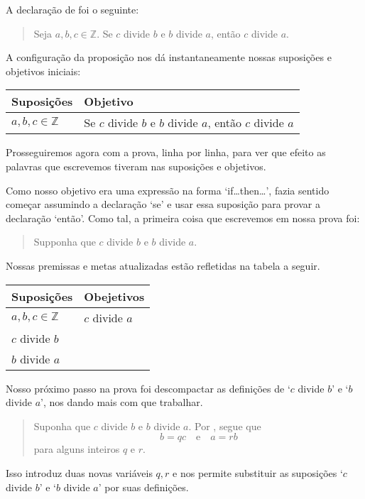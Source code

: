 \begin{example}
\label{exAssumptionsGoals}
A declaração de  foi o seguinte:
\begin{quote}
Seja $a,b,c \in \mathbb{Z}$. Se $c$ divide $b$ e $b$ divide $a$, então $c$ divide $a$.
\end{quote}
A configuração da proposição nos dá instantaneamente nossas suposições e objetivos iniciais:
\begin{center}
\begin{tabular}{C{150pt}|C{150pt}}
\textbf{Suposições} & \textbf{Objetivo} \\ \hline
$a,b,c \in \mathbb{Z}$ & Se $c$ divide $b$ e $b$ divide $a$, então $c$ divide $a$
\end{tabular}
\end{center}
Prosseguiremos agora com a prova, linha por linha, para ver que efeito as palavras que escrevemos tiveram nas suposições e objetivos.

Como nosso objetivo era uma expressão na forma `if\dots{}then\dots{}', fazia sentido começar assumindo a declaração `se' e usar essa suposição para provar a declaração `então'. Como tal, a primeira coisa que escrevemos em nossa prova foi:
\begin{quote}
Supponha que $c$ divide $b$ e $b$ divide $a$.
\end{quote}
Nossas premissas e metas atualizadas estão refletidas na tabela a seguir.
\begin{center}
\begin{tabular}{C{150pt}|C{150pt}}
\textbf{Suposições} & \textbf{Obejetivos} \\ \hline
$a,b,c \in \mathbb{Z}$ & $c$ divide $a$ \\
$c$ divide $b$ & \\
$b$ divide $a$ & 
\end{tabular}
\end{center}

Nosso próximo passo na prova foi descompactar as definições de `$c$ divide $b$' e `$b$ divide $a$', nos dando mais com que trabalhar.

\begin{quote}
{\color{gray} Suponha que $c$ divide $b$ e $b$ divide $a$.} Por , segue que
\[
b=qc \quad \text{e} \quad a=rb
\]
para alguns inteiros $q$ e $r$.
\end{quote}

Isso introduz duas novas variáveis $q,r$ e nos permite substituir as suposições `$c$ divide $b$' e `$b$ divide $a$' por suas definições.


\end{example}
